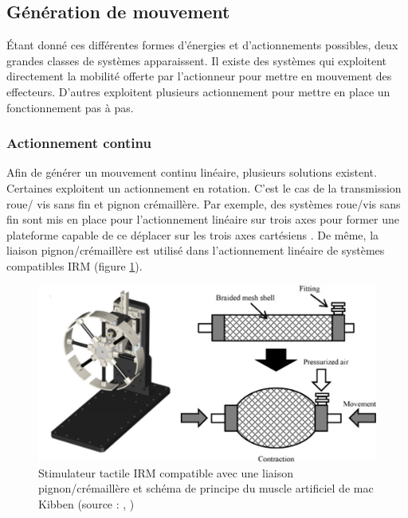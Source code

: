 \documentclass[10pt, a4paper]{article}
\begin{document}
    \subsection{Génération de mouvement}
    
        \qquad Étant donné ces différentes formes d'énergies et d'actionnements possibles, deux grandes classes de systèmes apparaissent. Il existe des systèmes qui exploitent directement la mobilité offerte par l'actionneur pour mettre en mouvement des effecteurs. D'autres exploitent plusieurs actionnement pour mettre en place un fonctionnement pas à pas.
        
        \subsubsection{Actionnement continu}
        
            \qquad Afin de générer un mouvement continu linéaire, plusieurs solutions existent. Certaines exploitent un actionnement en rotation. C'est le cas de la transmission roue/ vis sans fin et pignon crémaillère. Par exemple, des systèmes roue/vis sans fin sont mis en place pour l'actionnement linéaire sur trois axes pour former une plateforme capable de ce déplacer sur les trois axes cartésiens \cite{Su2012}. De même, la liaison pignon/crémaillère est utilisé dans l'actionnement linéaire de systèmes compatibles IRM \cite{Kanayama2019} (figure \ref{fig:stimIRM}).
            
\begin{figure}[ht!]
\centering
\includegraphics[scale=0.5]{ImageIntro/pignoncremMackibben.png}
\caption{ Stimulateur tactile IRM compatible avec une liaison pignon/crémaillère et schéma de principe du muscle artificiel de mac Kibben (source : \cite{Kanayama2019} , \cite{Takashima2010})}
\label{fig:stimIRM}
\end{figure}
            
\end{document}
